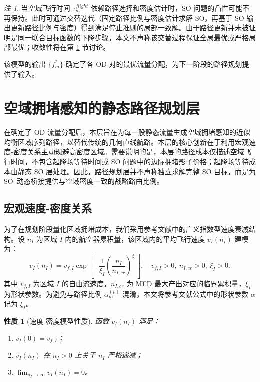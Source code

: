 \documentclass[a4paper,12pt]{article}
\theoremstyle{plain}
\newtheorem{property}[theorem]{性质}
\theoremstyle{definition}
\theoremstyle{remark}
\newtheorem{remark}[theorem]{注}
\begin{document}
\begin{remark}
当空域飞行时间 $\tau_m^{flight}$ 依赖路径选择和密度估计时，SO 问题的凸性可能不再保持。此时可通过交替迭代（固定路径比例与密度估计求解 SO，再基于 SO 输出更新路径比例与密度）得到满足停止准则的局部一致解。由于路径更新并未被证明是同一联合目标函数的下降步骤，本文不声称该交替过程保证全局最优或严格局部最优；收敛性将在第 \ref{sec:path_planning} 节讨论。
\end{remark}

该模型的输出 $\{f_m^*\}$ 确定了各 OD 对的最优流量分配，为下一阶段的路径规划提供了输入。

\section{空域拥堵感知的静态路径规划层}\label{sec:path_planning}

在确定了 OD 流量分配后，本层旨在为每一股静态流量生成空域拥堵感知的近似均衡区域序列路径，以替代传统的几何直线航路。本层的核心创新在于利用宏观速度-密度关系主动规避高密度区域。需要说明的是，本层的路径成本仅描述空域飞行时间，不包含起降场等待时间或 SO 问题中的边际拥堵影子价格；起降场等待成本由静态 SO 层处理。因此，路径规划层并不声称独立求解完整 SO 目标，而是为 SO--动态桥接提供与空域密度一致的战略路由比例。

\subsection{宏观速度-密度关系}
为了在规划阶段量化区域拥堵成本，我们采用参考文献中的广义指数型速度衰减结构。设 $n_I$ 为区域 $I$ 内的航空器累积量，该区域内的平均飞行速度 $v_I(n_I)$ 建模为：
\begin{equation} \label{eq:speed_density}
    v_I(n_I)
    =
    v_{f,I}
    \exp\left[
        -\frac{1}{\xi_I}
        \left(\frac{n_I}{n_{I,cr}}\right)^{\xi_I}
    \right],
    \quad v_{f,I}>0,\ n_{I,cr}>0,\ \xi_I>0 .
\end{equation}
其中 $v_{f,I}$ 为区域 $I$ 的自由流速度，$n_{I,cr}$ 为 MFD 最大产出对应的临界累积量，$\xi_I$ 为形状参数。为避免与路径比例 $\alpha_m^{(p)}$ 混淆，本文将参考文献公式中的形状参数 $\alpha$ 记为 $\xi_I$。

\begin{property}[速度-密度模型性质]\label{prop:speed_density}
函数 $v_I(n_I)$ 满足：
\begin{enumerate}
    \item $v_I(0) = v_{f,I}$；
    \item $v_I(n_I)$ 在 $n_I>0$ 上关于 $n_I$ 严格递减；
    \item $\lim_{n_I \to \infty} v_I(n_I) = 0$。
\end{enumerate}
\end{property}
\end{document}
